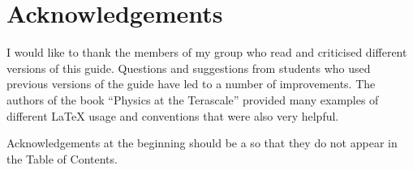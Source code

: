 \chapter*{Acknowledgements}
\label{sec:ack1}

I would like to thank the members of my group who read and criticised
different versions of this guide. Questions and suggestions from
students who used previous versions of the guide have led to a number
of improvements. The authors of the book \enquote{Physics at the
Terascale} provided many examples of different \LaTeX{} usage and
conventions that were also very helpful.

Acknowledgements at the beginning should be a  so that they
do not appear in the Table of Contents.

